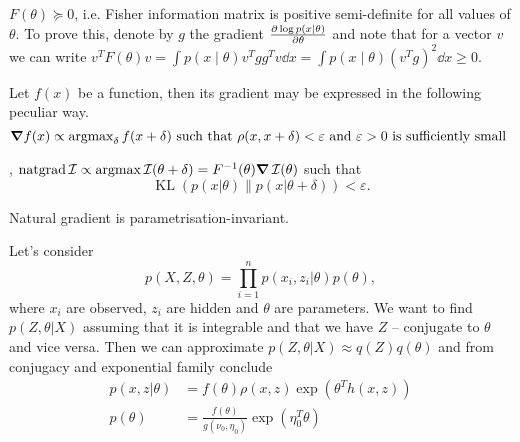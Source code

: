 \begin{eremark}
    $F(\theta) \succeq 0$, i.e. Fisher information matrix is positive semi-definite for all values of $\theta$.
    To prove this, denote by $g$ the gradient $\pdv{\log p(x\mid \theta)}{\theta}$ and note that for a vector $v$ we can write $v^T F(\theta) v = \int p(x\mid \theta) v^T gg^T v\dd x = \int p(x\mid \theta) (v^T g)^2 \dd x \ge 0$.
\end{eremark}

\vspace{3em}

Let $f(x)$ be a function, then its gradient may be expressed in the following peculiar way.
$$\grad f(x) \propto \operatorname{argmax}_{\delta} f(x + \delta)
\text{ such that } \rho(x, x+ \delta) < \varepsilon \text{ and } \varepsilon>0 \text{ is sufficiently small }
$$

\begin{edefn}
    , $\operatorname{natgrad} \operatorname{\mathcal{I}} \propto \operatorname{argmax} \operatorname{\mathcal{I}}(\theta + \delta) = F^{-1}(\theta) \grad \operatorname{\mathcal{I}} (\theta)$ such that $$\operatorname{KL} \left( p(x | \theta) \parallel p(x | \theta + \delta)\right) < \varepsilon.$$
\end{edefn}

\begin{eremark}
    Natural gradient is parametrisation-invariant.
\end{eremark}

Let's consider $$p(X, Z, \theta) = \prod_{i = 1}^n p(x_i, z_i | \theta) p(\theta),$$ where $x_i$ are observed, $z_i$ are hidden and $\theta$ are parameters. We want to find $p(Z, \theta | X)$ assuming that it is integrable and that we have $Z$ -- conjugate to $\theta$ and vice versa. Then we can approximate $p(Z, \theta | X) \approx q(Z) q(\theta)$ and from conjugacy and exponential family conclude
\begin{equation*}
    \begin{aligned}
        p(x, z | \theta) &= f(\theta) \rho(x, z) \exp (\theta^T h(x, z)) \\
        p(\theta) &= \frac{f(\theta)}{g(\nu_0, \eta_0)} \exp (\eta_0^T \theta)
    \end{aligned}
\end{equation*}

